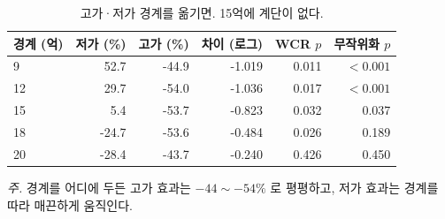 \begin{table}[htbp]
  \centering
  \caption{고가·저가 경계를 옮기면. 15억에 계단이 없다.}
  \label{tab:threshold}
  \begin{tabular}{lrrrrr}
    \toprule
    \textbf{경계 (억)} & \textbf{저가 (\%)} & \textbf{고가 (\%)} & \textbf{차이 (로그)} & \textbf{WCR $p$} & \textbf{무작위화 $p$} \\
    \midrule
    9 & 52.7 & -44.9 & -1.019 & 0.011 & $<0.001$ \\
    12 & 29.7 & -54.0 & -1.036 & 0.017 & $<0.001$ \\
    15 & 5.4 & -53.7 & -0.823 & 0.032 & 0.037 \\
    18 & -24.7 & -53.6 & -0.484 & 0.026 & 0.189 \\
    20 & -28.4 & -43.7 & -0.240 & 0.426 & 0.450 \\
    \bottomrule
  \end{tabular}

  \begin{minipage}{\linewidth}\footnotesize
  \textit{주.} 경계를 어디에 두든 고가 효과는 $-44 \sim -54\%$ 로 평평하고, 저가 효과는 경계를 따라 매끈하게 움직인다.
  \end{minipage}
\end{table}
